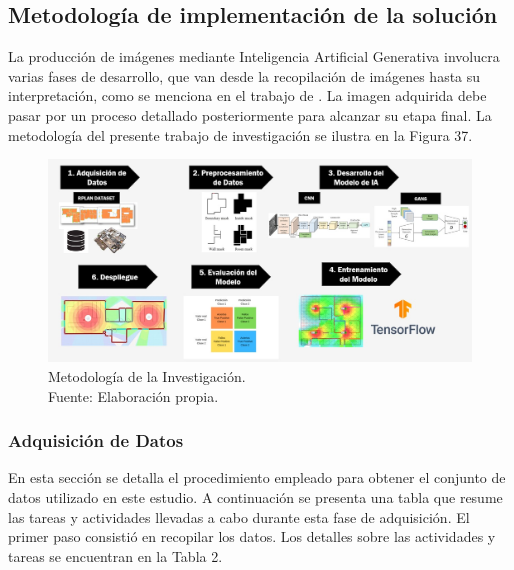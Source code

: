 \subsection{Metodología de implementación de la solución}

La producción de imágenes mediante Inteligencia Artificial Generativa involucra varias fases de desarrollo, que van desde la recopilación de imágenes hasta su interpretación, como se menciona en el trabajo de \cite{tec_kingma2019variat}. La imagen adquirida debe pasar por un proceso detallado posteriormente para alcanzar su etapa final. La metodología del presente trabajo de investigación se ilustra en la Figura 37.

\begin{figure}[h]
	\begin{center}
		\includegraphics[width=1.1\textwidth]{3/figures/metodologia.jpg}
		\caption[Metodología de la Investigación]{Metodología de la Investigación.\\
			Fuente: Elaboración propia.}
		\label{3:fig2}
	\end{center}
\end{figure}

\newpage
\subsubsection{Adquisición de Datos}

En esta sección se detalla el procedimiento empleado para obtener el conjunto de datos utilizado en este estudio. A continuación se presenta una tabla que resume las tareas y actividades llevadas a cabo durante esta fase de adquisición. El primer paso consistió en recopilar los datos. Los detalles sobre las actividades y tareas se encuentran en la Tabla 2.


